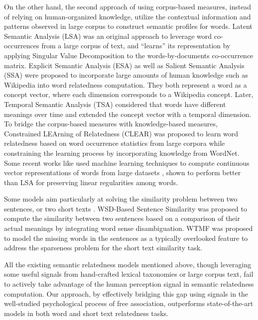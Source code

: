 \documentclass[letterpaper]{article}
\begin{document}
On the other hand, the second approach of using corpus-based
measures, instead of relying on human-organized knowledge, utilize
the contextual information and patterns observed in large corpus to
construct semantic profiles for words. Latent Semantic Analysis
(LSA) \cite{LSA} was an original approach to leverage word
co-occurrences from a large corpus of text, and ``learns''
its representation by applying Singular Value Decomposition to
the words-by-documents co-occurrence matrix. Explicit Semantic Analysis
(ESA) \cite{ESA} as well as Salient Semantic Analysis (SSA) \cite{SSA}
were proposed to incorporate large amounts of human
knowledge such as Wikipedia into word
relatedness computation. They both represent a word as a concept
vector, where each dimension corresponds to a Wikipedia concept.
Later, Temporal Semantic Analysis (TSA) \cite{TSA} considered that
words have different meanings over time and extended the concept
vector with a temporal dimension.
To bridge the corpus-based measures with
knowledge-based measures, Constrained LEArning of Relatedness (CLEAR) \cite{CLEAR}
was proposed to learn word
relatedness based on word occurrence statistics from large corpora
while constraining the learning process by incorporating knowledge
from WordNet.  Some recent works like \cite{mikolov} used machine learning techniques
to compute continuous vector representations of words from large datasets
, shown to perform better than LSA for preserving linear regularities among words.

Some models aim particularly at solving the similarity problem
between two sentences, or two short
texts \cite{WTMF,WTMF+PK,SPD-STS,LSA_STSS}. WSD-Based Sentence
Similarity \cite{SPD-STS} was proposed to compute the similarity
between two sentences based on a comparison of their actual meanings
by integrating word sense disambiguation. WTMF \cite{WTMF} was
proposed to model the missing words in the sentences as a typically
overlooked feature to address the sparseness problem for the short
text similarity task.

All the existing semantic relatedness models mentioned above, though
leveraging some useful signals from hand-crafted lexical taxonomies
or large corpus text, fail to actively take advantage of the human
perception signal in semantic relatedness computation. Our approach,
by effectively bridging this gap using signals in the well-studied
psychological process of free association, outperforms
state-of-the-art models in both word and short text relatedness
tasks.
\end{document}
